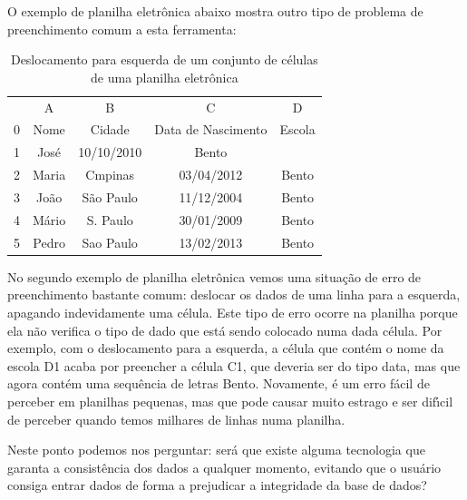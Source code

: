 \documentclass[
12pt,		%
openright,	%
twoside,  %
a4paper,			%
chapter=TITLE,		%
english,			%
french,				%
spanish,			%
brazil				%
]{USPSC-classe/USPSC}
\begin{document}
O exemplo de planilha eletr\^onica abaixo mostra outro tipo de problema de preenchimento comum a esta ferramenta:













\begin{table}[htb]
\tiny
\caption{\label{f6feaa39313aa0691b7fdadc84175a203e68bf77}Deslocamento para esquerda de um conjunto de c\'elulas de uma planilha eletr\^onica}

\centering
\begin{tabular}{|c|c|c|c|c|}
\hline
  &  A  &  B  &  C  &  D  \\
0 & Nome  &  Cidade  &  Data de Nascimento  &  Escola \\
1 & Jos\'e  &  10/10/2010  &  Bento  &   \\
2 & Maria  &  Cmpinas  &  03/04/2012  &  Bento \\
3 & Jo\~ao  &  S\~ao Paulo  &  11/12/2004  &  Bento \\
4 & M\'ario  &  S. Paulo  &  30/01/2009  &  Bento \\
5 & Pedro  &  Sao Paulo  &  13/02/2013  &  Bento \\
\hline
\end{tabular}
\end{table}


No segundo exemplo de planilha eletr\^onica vemos uma situa\c{c}\~ao de erro de preenchimento bastante comum: deslocar os dados de uma linha para a esquerda, apagando indevidamente uma c\'elula. Este tipo de erro ocorre na planilha porque ela n\~ao verifica o tipo de dado que est\'a sendo colocado numa dada c\'elula. Por exemplo, com o deslocamento para a esquerda, a c\'elula que cont\'em o nome da escola D1 acaba por preencher a c\'elula C1, que deveria ser do tipo data, mas que agora cont\'em uma sequ\^encia de letras \textquotedbl Bento\textquotedbl . Novamente, \'e um erro f\'acil de perceber em planilhas pequenas, mas que pode causar muito estrago e ser dif\'{\i}cil de perceber quando temos milhares de linhas numa planilha.









Neste ponto podemos nos perguntar: ser\'a que existe alguma tecnologia que garanta a consist\^encia dos dados a qualquer momento, evitando que o usu\'ario consiga entrar dados de forma a prejudicar a integridade da base de dados?
\end{document}
